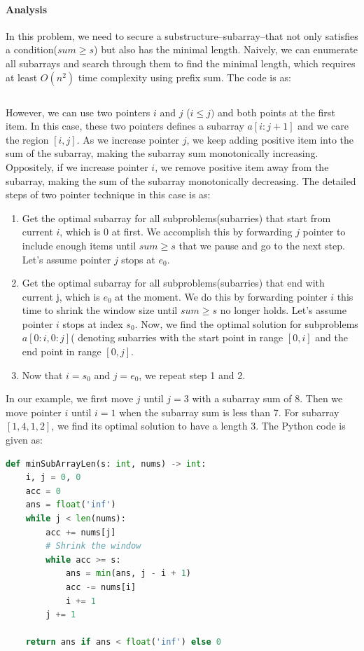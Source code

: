 \documentclass[../main.tex]{subfiles}
\begin{document}
\paragraph{Analysis} In this problem, we need to secure a substructure--subarray--that not only satisfies a condition($sum \geq s$) but also  has the minimal length. Naively, we can enumerate all subarrays and search through them to find the minimal length, which requires at least $O(n^2)$ time complexity using prefix sum. The code is as:
\begin{lstlisting}[language=Python]
\end{lstlisting}
However, we can use two pointers $i$ and $j$ ($i\leq j)$ and both points at the first item. In this case, these two pointers defines a subarray  $a[i:j+1]$ and we care the region $[i, j]$. As we increase pointer $j$, we keep adding positive item into the sum of the subarray, making the subarray sum monotonically increasing. Oppositely, if we increase pointer $i$, we remove positive item away from the subarray, making the sum of the subarray monotonically decreasing. The detailed steps of two pointer technique in this case is as:
\begin{enumerate}
    \item Get the optimal subarray for all subproblems(subarries) that start from current $i$, which is $0$ at first. We accomplish this by forwarding $j$ pointer to include enough items until $sum \geq s$ that we pause and go to the next step. Let's assume pointer $j$ stops at $e_0$.  
    \item Get the optimal subarray for all subproblems(subarries) that end with current j, which is $e_0$ at the moment. We do this by forwarding pointer $i$ this time to shrink the window size until $sum\geq s$ no longer holds. Let's assume pointer $i$ stops at index $s_0$. Now, we find the optimal solution for subproblems $a[0:i,0:j]$( denoting subarries with the start point in range $[0, i]$ and the end point in range $[0,j]$. 
    \item Now that $i=s_0$ and $j=e_0$, we repeat step 1 and 2.
\end{enumerate}
In our example, we first move $j$ until $j=3$ with a subarray sum of 8. Then we move pointer $i$ until $i=1$ when the subarray sum is less than 7. For subarray $[1, 4, 1, 2]$, we find its optimal solution to have a length 3. The Python code is given as:
\begin{lstlisting}[language=Python]
def minSubArrayLen(s: int, nums) -> int:
    i, j = 0, 0
    acc = 0
    ans = float('inf')
    while j < len(nums):
        acc += nums[j]
        # Shrink the window
        while acc >= s:
            ans = min(ans, j - i + 1)
            acc -= nums[i]
            i += 1
        j += 1
        
    return ans if ans < float('inf') else 0
\end{lstlisting}
\end{document}
